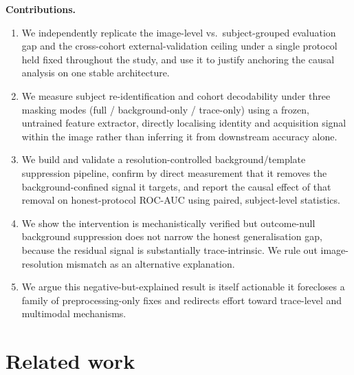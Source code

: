 \documentclass[3p,final,10pt]{elsarticle}
\let\oldsection\section
\renewcommand{\section}{\FloatBarrier\oldsection}
\begin{document}
\textbf{Contributions.}
\begin{enumerate}
  \item We independently replicate the image-level vs.\ subject-grouped
        evaluation gap and the cross-cohort external-validation ceiling under
        a single protocol held fixed throughout the study, and use it to
        justify anchoring the causal analysis on one stable architecture.
  \item We measure subject re-identification and cohort decodability under
        three masking modes (full / background-only / trace-only) using a
        frozen, untrained feature extractor, directly localising identity
        and acquisition signal within the image rather than inferring it
        from downstream accuracy alone.
  \item We build and validate a resolution-controlled background/template
        suppression pipeline, confirm by direct measurement that it removes
        the background-confined signal it targets, and report the causal
        effect of that removal on honest-protocol ROC-AUC using paired,
        subject-level statistics.
  \item We show the intervention is mechanistically verified but
        outcome-null background suppression does not narrow the honest
        generalisation gap, because the residual signal is substantially
        trace-intrinsic. We rule out image-resolution mismatch as an
        alternative explanation.
  \item We argue this negative-but-explained result is itself
        actionable it forecloses a family of preprocessing-only fixes and
        redirects effort toward trace-level and multimodal mechanisms.
\end{enumerate}

\section{Related work}
\label{sec:related}
\end{document}
